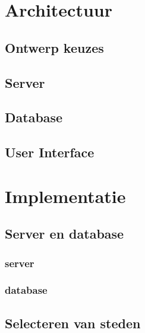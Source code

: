 \documentclass[twoside,openright]{uva-bachelor-thesis}
\begin{document}
\chapter{Architectuur}
	\section{Ontwerp keuzes}
	\section{Server}
	\section{Database}
	\section{User Interface}
	
\chapter{Implementatie}
	\section{Server en database}
		\subsection{server}
		\subsection{database}
	\section{Selecteren van steden}
\end{document}
